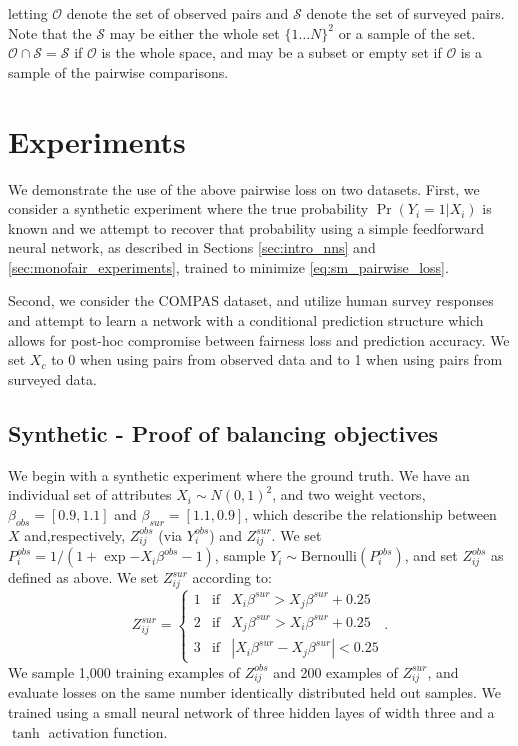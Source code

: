     letting $\mathcal{O}$ denote the set of observed pairs and $\mathcal{S}$ denote the set of surveyed pairs.  Note that the $\mathcal{S}$ may be either the whole set $\{1 \ldots N\}^2$ or a sample of the set.  $\mathcal{O} \cap \mathcal{S} = \mathcal{S}$ if $\mathcal{O}$ is the whole space, and may be a subset or empty set if $\mathcal{O}$ is a sample of the pairwise comparisons.

\section{Experiments}\label{sec:softmono_experiments}

    We demonstrate the use of the above pairwise loss on two datasets.  First, we consider a synthetic experiment where the true probability $\Pr(Y_i = 1 | X_i)$ is known and we attempt to recover that probability using a simple feedforward neural network, as described in Sections \ref{sec:intro_nns} and \ref{sec:monofair_experiments}, trained to minimize \ref{eq:sm_pairwise_loss}.  
    
    Second, we consider the COMPAS dataset, and utilize human survey responses and attempt to learn a network with a conditional prediction structure which allows for post-hoc compromise between fairness loss and prediction accuracy.  We set $X_{c}$ to 0 when using pairs from observed data and to 1 when using pairs from surveyed data.

    \subsection{Synthetic - Proof of balancing objectives}
    
        We begin with a synthetic experiment where the ground truth.  We have an individual set of attributes $X_i \sim N(0, 1)^2$, and two weight vectors,  $\beta_{obs} = [0.9, 1.1]$ and $\beta_{sur} = [1.1, 0.9]$, which describe the relationship between $X$ and,respectively,  $Z_{ij}^{obs}$ (via $Y_{i}^{obs}$) and $Z_{ij}^{sur}$.  We set $P_i^{obs} = 1 / (1 + \exp{-X_i \beta^{obs} - 1})$, sample $Y_i \sim \mbox{Bernoulli}(P_i^{obs})$, and set $Z_{ij}^{obs}$ as defined as above.  We set $Z_{ij}^{sur}$ according to:
            $$ Z_{ij}^{sur} = \left\{ \begin{array}{lll}
                    1 & \mbox{if} & X_{i}\beta^{sur} > X_{j}\beta^{sur} + 0.25\\
                    2 & \mbox{if} & X_{j}\beta^{sur} > X_{i}\beta^{sur} + 0.25 \\
                    3 & \mbox{if} & | X_{i}\beta^{sur} - X_{j}\beta^{sur} | < 0.25
                \end{array} \right. .$$
        We sample 1,000 training examples of $Z_{ij}^{obs}$ and 200 examples of $Z_{ij}^{sur}$, and evaluate losses on the same number identically distributed held out samples.  We trained using a small neural network of three hidden layes of width three and a $\tanh$ activation function.
        
